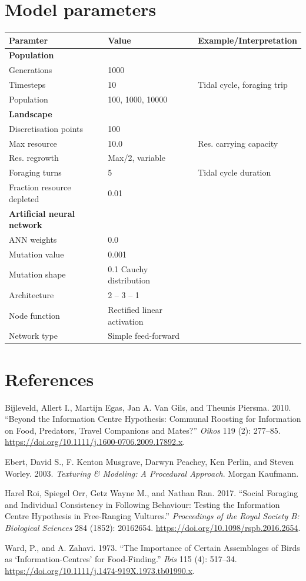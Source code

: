 \hypertarget{model-parameters}{%
\section{Model parameters}\label{model-parameters}}

\begin{longtable}[]{@{}lll@{}}
\toprule
Paramter & Value & Example/Interpretation\tabularnewline
\midrule
\endhead
\textbf{Population} & &\tabularnewline
Generations & 1000 &\tabularnewline
Timesteps & 10 & Tidal cycle, foraging trip\tabularnewline
Population & 100, 1000, 10000 &\tabularnewline
\textbf{Landscape} & &\tabularnewline
Discretisation points & 100 &\tabularnewline
Max resource & 10.0 & Res. carrying capacity\tabularnewline
Res. regrowth & Max/2, variable &\tabularnewline
Foraging turns & 5 & Tidal cycle duration\tabularnewline
Fraction resource depleted & 0.01 &\tabularnewline
\textbf{Artificial neural network} & &\tabularnewline
ANN weights & 0.0 &\tabularnewline
Mutation value & 0.001 &\tabularnewline
Mutation shape & 0.1 Cauchy distribution &\tabularnewline
Architecture & 2 -- 3 -- 1 &\tabularnewline
Node function & Rectified linear activation &\tabularnewline
Network type & Simple feed-forward &\tabularnewline
\bottomrule
\end{longtable}

\hypertarget{references}{%
\section*{References}\label{references}}

\hypertarget{refs}{}
\leavevmode\hypertarget{ref-bijleveld2010}{}%
Bijleveld, Allert I., Martijn Egas, Jan A. Van Gils, and Theunis
Piersma. 2010. ``Beyond the Information Centre Hypothesis: Communal
Roosting for Information on Food, Predators, Travel Companions and
Mates?'' \emph{Oikos} 119 (2): 277--85.
\url{https://doi.org/10.1111/j.1600-0706.2009.17892.x}.

\leavevmode\hypertarget{ref-ebert2003}{}%
Ebert, David S., F. Kenton Musgrave, Darwyn Peachey, Ken Perlin, and
Steven Worley. 2003. \emph{Texturing \& Modeling: A Procedural
Approach}. Morgan Kaufmann.

\leavevmode\hypertarget{ref-harelroi2017}{}%
Harel Roi, Spiegel Orr, Getz Wayne M., and Nathan Ran. 2017. ``Social
Foraging and Individual Consistency in Following Behaviour: Testing the
Information Centre Hypothesis in Free-Ranging Vultures.''
\emph{Proceedings of the Royal Society B: Biological Sciences} 284
(1852): 20162654. \url{https://doi.org/10.1098/rspb.2016.2654}.

\leavevmode\hypertarget{ref-ward1973}{}%
Ward, P., and A. Zahavi. 1973. ``The Importance of Certain Assemblages
of Birds as `Information-Centres' for Food-Finding.'' \emph{Ibis} 115
(4): 517--34. \url{https://doi.org/10.1111/j.1474-919X.1973.tb01990.x}.
